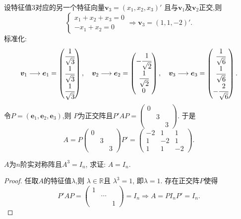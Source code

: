 \begin{solution}
  设特征值$3$对应的另一个特征向量$\bm{v}_3=(x_1,x_2,x_3)'$
  且与$\bm{v}_1$及$\bm{v}_2$正交,则
  \[
  \begin{cases}
    x_1+x_2+x_3=0\\
    -x_1+x_2=0
  \end{cases} \Longrightarrow \bm{v}_3=(1,1,-2)'.
  \]
  标准化:
  \[
  \bm{v}_1 \longrightarrow \bm{e}_1 = \begin{pmatrix}
    \cfrac{1}{\sqrt{3}}\\
    \cfrac{1}{\sqrt{3}}\\
    \cfrac{1}{\sqrt{3}}
  \end{pmatrix}, \quad
  \bm{v}_2 \longrightarrow \bm{e}_2 = \begin{pmatrix}
    -\cfrac{1}{\sqrt{2}}\\
    \cfrac{1}{\sqrt{2}}\\
    0
  \end{pmatrix}, \quad
  \bm{v}_3 \longrightarrow \bm{e}_3 = \begin{pmatrix}
    \cfrac{1}{\sqrt{6}}\\
    \cfrac{1}{\sqrt{6}}\\
    -\cfrac{2}{\sqrt{6}}
  \end{pmatrix}.
  \]
  令$P=(\bm{e}_1,\bm{e}_2,\bm{e}_3)$,则
  $P$为正交阵且$P'AP=\begin{pmatrix}
    0 & &\\
    & 3 & \\
    & & 3
  \end{pmatrix}$.
于是
\[
A = P\begin{pmatrix}
  0 & &\\
  & 3 & \\
  & & 3
\end{pmatrix}P' = \begin{pmatrix}
  -2 & 1 & 1\\
  1 & -2 & 1\\
  1 & 1 & -2
\end{pmatrix}.
\]
\end{solution}

\begin{example}
  $A$为$n$阶实对称阵且$A^3=I_n$,
  求证: $A=I_n$.
\end{example}

\begin{proof}
  任取$A$的特征值$\lambda$,则
  $\lambda\in \mathbb{R}$且
  $\lambda^3=1$,
  即$\lambda=1$.
  存在正交阵$P$使得
  \[P'AP=\begin{pmatrix}
    1 & &\\
    & \cdots & \\
    & & 1
  \end{pmatrix}=I_n \Longrightarrow 
  A = PI_nP' = I_n.
  \]
\end{proof}


